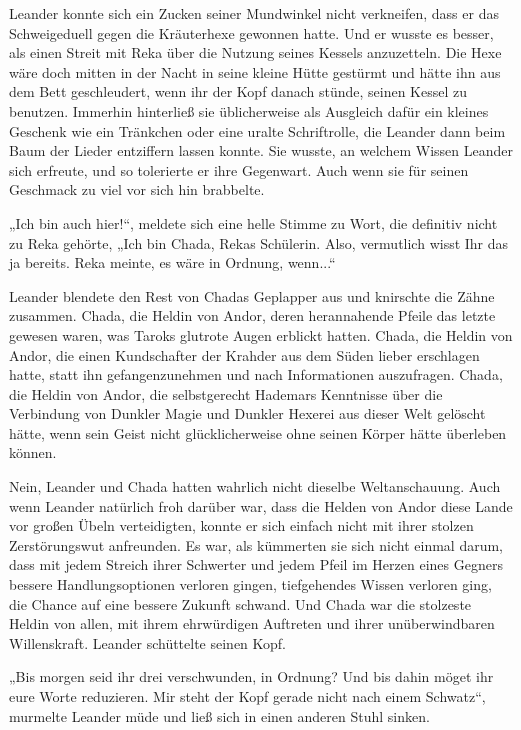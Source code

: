 \documentclass[10pt, a4paper, oneside]{book}
\begin{document}
Leander konnte sich ein Zucken seiner Mundwinkel nicht verkneifen, dass er das Schweigeduell gegen die Kräuterhexe gewonnen hatte. Und er wusste es besser, als einen Streit mit Reka über die Nutzung seines Kessels anzuzetteln. Die Hexe wäre doch mitten in der Nacht in seine kleine Hütte gestürmt und hätte ihn aus dem Bett geschleudert, wenn ihr der Kopf danach stünde, seinen Kessel zu benutzen. Immerhin hinterließ sie üblicherweise als Ausgleich dafür ein kleines Geschenk wie ein Tränkchen oder eine uralte Schriftrolle, die Leander dann beim Baum der Lieder entziffern lassen konnte. Sie wusste, an welchem Wissen Leander sich erfreute, und so tolerierte er ihre Gegenwart. Auch wenn sie für seinen Geschmack zu viel vor sich hin brabbelte.

„Ich bin auch hier!“, meldete sich eine helle Stimme zu Wort, die definitiv nicht zu Reka gehörte, „Ich bin Chada, Rekas Schülerin. Also, vermutlich wisst Ihr das ja bereits. Reka meinte, es wäre in Ordnung, wenn...“

Leander blendete den Rest von Chadas Geplapper aus und knirschte die Zähne zusammen. Chada, die Heldin von Andor, deren herannahende Pfeile das letzte gewesen waren, was Taroks glutrote Augen erblickt hatten. Chada, die Heldin von Andor, die einen Kundschafter der Krahder aus dem Süden lieber erschlagen hatte, statt ihn gefangenzunehmen und nach Informationen auszufragen. Chada, die Heldin von Andor, die selbstgerecht Hademars Kenntnisse über die Verbindung von Dunkler Magie und Dunkler Hexerei aus dieser Welt gelöscht hätte, wenn sein Geist nicht glücklicherweise ohne seinen Körper hätte überleben können.

Nein, Leander und Chada hatten wahrlich nicht dieselbe Weltanschauung. Auch wenn Leander natürlich froh darüber war, dass die Helden von Andor diese Lande vor großen Übeln verteidigten, konnte er sich einfach nicht mit ihrer stolzen Zerstörungswut anfreunden. Es war, als kümmerten sie sich nicht einmal darum, dass mit jedem Streich ihrer Schwerter und jedem Pfeil im Herzen eines Gegners bessere Handlungsoptionen verloren gingen, tiefgehendes Wissen verloren ging, die Chance auf eine bessere Zukunft schwand. Und Chada war die stolzeste Heldin von allen, mit ihrem ehrwürdigen Auftreten und ihrer unüberwindbaren Willenskraft. Leander schüttelte seinen Kopf.

„Bis morgen seid ihr drei verschwunden, in Ordnung? Und bis dahin möget ihr eure Worte reduzieren. Mir steht der Kopf gerade nicht nach einem Schwatz“, murmelte Leander müde und ließ sich in einen anderen Stuhl sinken.
\end{document}
